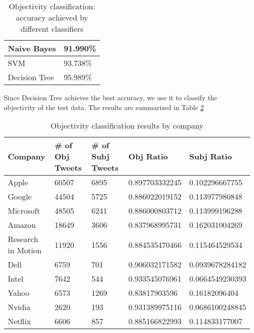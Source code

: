 \documentclass[12pt]{article}
\begin{document}
\begin{table}
\begin{center}
    \begin{tabular}{ | l || l | }
        \hline
        Naive Bayes &  91.990\% \\ \hline
        SVM & 93.738\% \\ \hline
        Decision Tree & 95.989\% \\ \hline
    \end{tabular}
\caption{Objectivity classification: accuracy achieved by different classifiers}
\label{classifiers-obj}
\end{center}
\end{table}

Since Decision Tree achieves the best accuracy, we use it to classify the objectivity of the test data. The results are summarized in Table \ref{objectivity-by-company}

\begin{table}
\begin{center}
    \begin{tabular}{ | l || l | l | l | l | }
        \hline
        Company &  \# of Obj Tweets & \# of Subj Tweets & Obj Ratio & Subj Ratio \\ \hline
        Apple &  60507 & 6895 & 0.897703332245 & 0.102296667755 \\ \hline
        Google &  44504 & 5725 & 0.886022019152 & 0.113977980848 \\ \hline
        Microsoft &  48505 & 6241 & 0.886000803712 & 0.113999196288 \\ \hline
        Amazon &  18649 & 3606 & 0.837968995731 & 0.162031004269 \\ \hline
        Research in Motion  &  11920 & 1556 & 0.884535470466 & 0.115464529534 \\ \hline
        Dell &  6759 & 701 & 0.906032171582 & 0.0939678284182 \\ \hline
        Intel &  7642 & 544 & 0.933545076961 & 0.0664549230393 \\ \hline
        Yahoo &  6573 & 1269 & 0.83817903596 & 0.16182096404 \\ \hline
        Nvidia &  2620 & 193 & 0.931389975116 & 0.0686100248845 \\ \hline
        Netflix &  6606 & 857 & 0.885166822993 & 0.114833177007 \\ \hline
    \end{tabular}
\caption{Objectivity classification results by company}
\label{objectivity-by-company}
\end{center}
\end{table}
\end{document}
